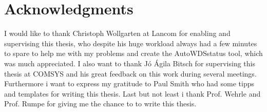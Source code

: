 \cleardoublepage

\chapter*{Acknowledgments}

I would like to thank Christoph Wollgarten at Lancom for enabling and supervising this thesis, who despite his huge workload always had a few minutes to spare
to help me with my problems and create the AutoWDSstatus tool, which was much appreciated.
I also want to thank J\'o \'Agila Bitsch for supervising this thesis at COMSYS and his great feedback on this work during several meetings.
Furthermore i want to express my gratitude to Paul Smith who had some tipps and templates for writing this thesis.
Last but not least i thank Prof. Wehrle and Prof. Rumpe for giving me the chance to to write this thesis.